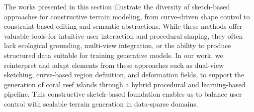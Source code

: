 The works presented in this section illustrate the diversity of sketch-based approaches for constructive terrain modeling, from curve-driven shape control to constraint-based editing and semantic abstractions. While these methods offer valuable tools for intuitive user interaction and procedural shaping, they often lack ecological grounding, multi-view integration, or the ability to produce structured data suitable for training generative models. In our work, we reinterpret and adapt elements from these approaches such as dual-view sketching, curve-based region definition, and deformation fields, to support the generation of coral reef islands through a hybrid procedural and learning-based pipeline. This constructive sketch-based foundation enables us to balance user control with scalable terrain generation in data-sparse domains.








